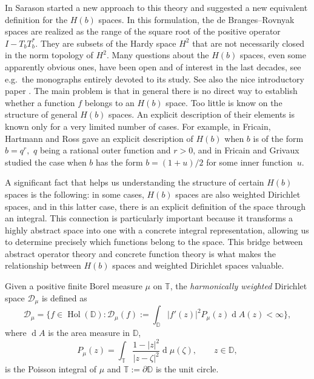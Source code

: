 \documentclass[12pt]{amsart}
\theoremstyle{definition}
\theoremstyle{remark}
\theoremstyle{remark}
\begin{document}
In \cite{sarHb} Sarason started a new approach to this theory and suggested a new equivalent definition for the $H(b)$ spaces. In this formulation, the de Branges--Rovnyak spaces are realized as the range of the square root of the positive operator $I-T_b T_b^*$. They
are subsets of the Hardy space $H^2$ that are not necessarily closed in the norm topology of $H^2$. Many questions about the $H(b)$ spaces, even some apparently obvious ones, have been open and of interest in
the last decades, see e.g.\ the  monographs  \cite{hb1, hb2,sarHb} entirely devoted to its study. See also the nice introductory paper \cite{Timotin}. The main problem is that in general there is no direct way to establish whether a function $f$ belongs to an $H(b)$ space. Too little is know on the structure of
general $H(b)$ spaces. An explicit description of their elements is known only for a very limited number of cases. For example, in \cite{concrete} Fricain, Hartmann and Ross gave an explicit description of $H(b)$ when $b$ is of the form  $b=q^r,$ $q$ being a
rational outer function and $r>0$, and in \cite{FricainGrivaux} Fricain and Grivaux studied the case when $b$ has the form $b=(1+u)/2$ for some inner function~$u$.



A significant fact that helps us understanding the structure
of certain $H(b)$ spaces is the following: in some cases, $H(b)$
spaces are also weighted Dirichlet spaces, and in this latter case,
there is an explicit definition of the space through an integral. This
connection is particularly important because it transforms a highly
abstract 
space into one with a concrete integral representation, allowing us to
determine precisely which functions belong to the space. This bridge
between abstract operator 
theory and concrete function theory is what makes the relationship
between $H(b)$ spaces and weighted Dirichlet spaces valuable.  



Given a positive finite Borel measure $\mu$ on $\mathbb{T}$, the \emph{harmonically weighted} Dirichlet space $\mathcal{D}_\mu$ is defined as
\[\mathcal{D}_\mu=\big\{f\in\operatorname{Hol}(\mathbb{D})\colon \mathcal{D}_\mu(f):=\int_\mathbb{D} |f'(z)|^2P_\mu(z) \operatorname{d}\!A(z)<\infty\big\}, \]
where $\operatorname{d}\!A$ is the area measure in $\mathbb{D}$, \[P_\mu(z)=\int_{\mathbb{T}}\frac{1-|z|^2}{|z-\zeta|^2}\operatorname{d}\!\mu(\zeta), \qquad z\in\mathbb{D},\]
is the Poisson integral of $\mu$ and $\mathbb{T}:=\partial\mathbb{D}$ is the unit circle.
\end{document}
